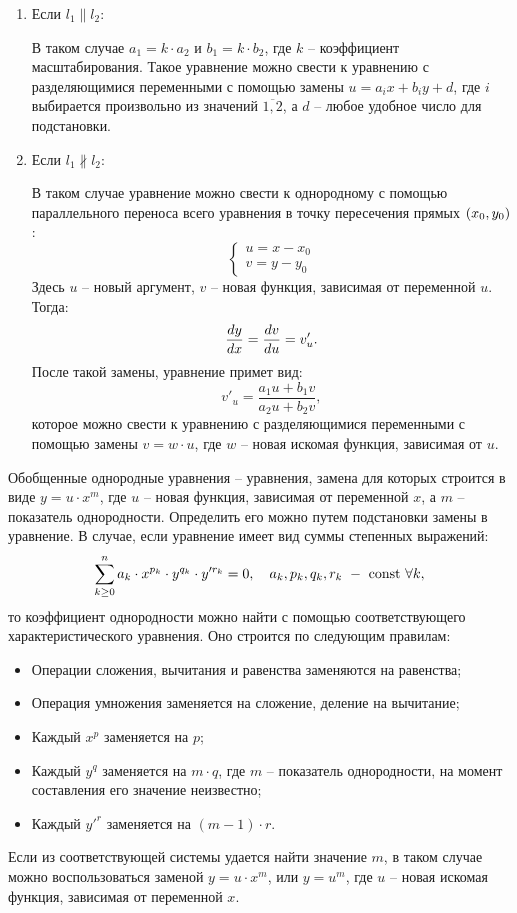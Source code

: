 	\begin{enumerate}
		\item Если $l_1 \parallel l_2$:

			В таком случае $a_1 = k \cdot a_2$ и $b_1 = k \cdot b_2$, где $k$ -- коэффициент масштабирования. Такое уравнение можно свести к уравнению с разделяющимися переменными с помощью замены $u = a_i x + b_i y + d$, где $i$ выбирается произвольно из значений $\overline{1, 2}$, а $d$ -- любое удобное число для подстановки.

		\item Если $l_1 \nparallel l_2$:

			В таком случае уравнение можно свести к однородному с помощью параллельного переноса всего уравнения в точку пересечения прямых $\left( x_0, y_0 \right)$:
			\[ \left\lbrace \begin{split} u = x - x_0 \\ v = y - y_0 \end{split} \right. \]
			Здесь $u$ -- новый аргумент, $v$ -- новая функция, зависимая от переменной $u$. Тогда:
			\[ \dfrac{d y}{d x} = \dfrac{d v}{d u} = v'_u. \]
			После такой замены, уравнение примет вид:
			\[ v'_u = \frac{a_1 u + b_1 v}{a_2 u + b_2 v}, \]
			которое можно свести к уравнению с разделяющимися переменными с помощью замены $v = w \cdot u$, где $w$ -- новая искомая функция, зависимая от $u$.

	\end{enumerate}

	Обобщенные однородные уравнения -- уравнения, замена для которых строится в виде $y = u \cdot x^m$, где $u$ -- новая функция, зависимая от переменной $x$, а $m$ -- показатель однородности. Определить его можно путем подстановки замены в уравнение. В случае, если уравнение имеет вид суммы степенных выражений:
	\[ \sum_{k \ge 0}^n a_k \cdot x^{p_k} \cdot y^{q_k} \cdot y'^{r_k} = 0, \quad a_k, p_k, q_k, r_k ~ - ~ \mathrm{const} ~ \forall k, \]
	то коэффициент однородности можно найти с помощью соответствующего характеристического уравнения. Оно строится по следующим правилам:
	\begin{itemize}
		\item Операции сложения, вычитания и равенства заменяются на равенства;
		\item Операция умножения заменяется на сложение, деление на вычитание;
		\item Каждый $x^p$ заменяется на $p$;
		\item Каждый $y^q$ заменяется на $m \cdot q$, где $m$ -- показатель однородности, на момент составления его значение неизвестно;
		\item Каждый $y'^{r}$ заменяется на $(m - 1) \cdot r$.
	\end{itemize}
	Если из соответствующей системы удается найти значение $m$, в таком случае можно воспользоваться заменой $y = u \cdot x^m$, или $y = u^m$, где $u$ -- новая искомая функция, зависимая от переменной $x$.

